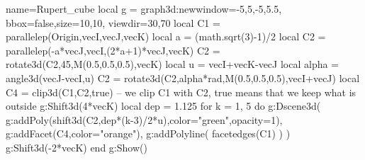 \documentclass[border=2 mm]{standalone}
\begin{document}
\begin{luadraw}{name=Rupert_cube}
local g = graph3d:new{window={-5,5,-5,5.5}, bbox=false,size={10,10}, viewdir={30,70}}
local C1 = parallelep(Origin,vecI,vecJ,vecK)
local a = (math.sqrt(3)-1)/2
local C2 = parallelep(-a*vecJ,vecI,(2*a+1)*vecJ,vecK)
C2 = rotate3d(C2,45,{M(0.5,0.5,0.5),vecK})
local u = vecI+vecK-vecJ
local alpha = angle3d(vecJ-vecI,u)
C2 = rotate3d(C2,alpha*rad,{M(0.5,0.5,0.5),vecI+vecJ})
local C4 = clip3d(C1,C2,true) -- we clip C1 with C2, true means that we keep what is outside
g:Shift3d(4*vecK)
local dep = 1.125
for k = 1, 5 do
    g:Dscene3d(
        g:addPoly(shift3d(C2,dep*(k-3)/2*u),{color="green",opacity=1}),
        g:addFacet(C4,{color="orange"}), 
        g:addPolyline( facetedges(C1) )
        )
    g:Shift3d(-2*vecK)
end
g:Show()
\end{luadraw}
\end{document}
